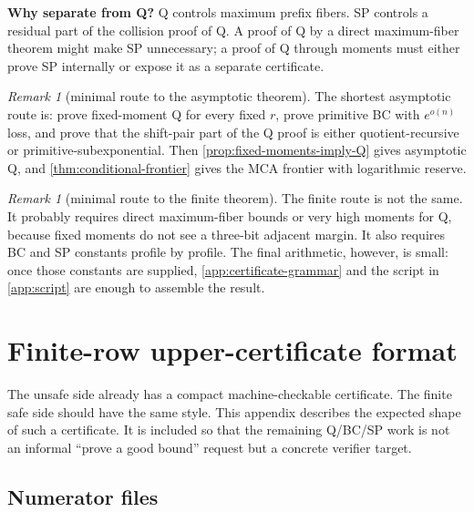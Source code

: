 \documentclass[11pt]{article}
\theoremstyle{definition}
\theoremstyle{remark}
\newtheorem{remark}[theorem]{Remark}
\begin{document}
\textbf{Why separate from Q?}  Q controls maximum prefix fibers.  SP controls a residual part of the collision proof of Q.  A proof of Q by a direct maximum-fiber theorem might make SP unnecessary; a proof of Q through moments must either prove SP internally or expose it as a separate certificate.

\begin{remark}[minimal route to the asymptotic theorem]
The shortest asymptotic route is: prove fixed-moment Q for every fixed \(r\), prove primitive BC with \(e^{o(n)}\) loss, and prove that the shift-pair part of the Q proof is either quotient-recursive or primitive-subexponential.  Then \cref{prop:fixed-moments-imply-Q} gives asymptotic Q, and \cref{thm:conditional-frontier} gives the MCA frontier with logarithmic reserve.
\end{remark}

\begin{remark}[minimal route to the finite theorem]
The finite route is not the same.  It probably requires direct maximum-fiber bounds or very high moments for Q, because fixed moments do not see a three-bit adjacent margin.  It also requires BC and SP constants profile by profile.  The final arithmetic, however, is small: once those constants are supplied, \cref{app:certificate-grammar} and the script in \cref{app:script} are enough to assemble the result.
\end{remark}

\section{Finite-row upper-certificate format}\label{app:finite-upper-format}

The unsafe side already has a compact machine-checkable certificate.  The finite safe side should have the same style.  This appendix describes the expected shape of such a certificate.  It is included so that the remaining Q/BC/SP work is not an informal ``prove a good bound'' request but a concrete verifier target.

\subsection{Numerator files}\label{appsub:numerator-files}
\end{document}
